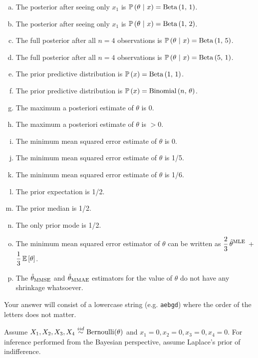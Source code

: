 \documentclass[12pt,landscape]{article}
\newcommand{\instr}{\small Your answer will consist of a lowercase string (e.g. \texttt{aebgd}) where the order of the letters does not matter. \normalsize}
\begin{document}
\begin{enumerate}[(a)]
\item The posterior after seeing only $x_1$ is $\mathbb{P}\left(\theta~|~x\right) = \mathrm{Beta}\left(1,\,1\right)$.
\item The posterior after seeing only $x_1$ is $\mathbb{P}\left(\theta~|~x\right) = \mathrm{Beta}\left(1,\,2\right)$.
\item The full posterior after all $n=4$ observations is $\mathbb{P}\left(\theta~|~x\right) = \mathrm{Beta}\left(1,\,5\right)$.
\item The full posterior after all $n=4$ observations  is $\mathbb{P}\left(\theta~|~x\right) = \mathrm{Beta}\left(5,\,1\right)$.
\item The prior predictive distribution is $\mathbb{P}\left(x\right) = \mathrm{Beta}\left(1,\,1\right)$.
\item The prior predictive distribution is $\mathbb{P}\left(x\right) = \mathrm{Binomial}\left(n,\,\theta\right)$.
\item The maximum a posteriori estimate of $\theta$ is 0.
\item The maximum a posteriori estimate of $\theta$ is $>0$.
\item The minimum mean squared error estimate of $\theta$ is 0.
\item The minimum mean squared error estimate of $\theta$ is 1/5.
\item The minimum mean squared error estimate of $\theta$ is 1/6.
\item The prior expectation is 1/2.
\item The prior median is 1/2.
\item The only prior mode is 1/2.
\item The minimum mean squared error estimator of $\theta$ can be written as $\displaystyle\frac{2}{3}\,\hat{\theta}^{\mathrm{MLE}}$ + $\displaystyle\frac{1}{3}\,\mathbb{E}\left[\theta\right]$.
\item The $\hat{\theta}_{\mathrm{MMSE}}$ and $\hat{\theta}_{\mathrm{MMAE}}$ estimators for the value of $\theta$ do not have any shrinkage whatsoever.
\end{enumerate}
\eenum\instr\pagebreak


\problem{} Assume $X_1, X_2, X_3, X_4 \iid \text{Bernoulli}(\theta)$ and $x_1 = 0, x_2 = 0, x_3 = 0, x_4 = 0$. For inference performed from the Bayesian perspective, assume Laplace's prior of indifference.

\vspace{-0.2cm}\benum{} 
\end{document}
